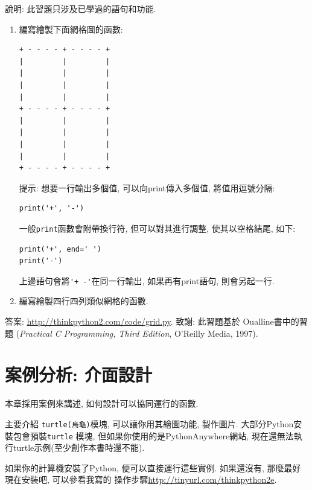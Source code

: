\documentclass[10pt]{book}
\begin{document}
\begin{exercise}

說明: 此習題只涉及已學過的語句和功能. 

\begin{enumerate}

\item 編寫繪製下面網格圖的函數:

\begin{verbatim}
+ - - - - + - - - - +
|         |         |
|         |         |
|         |         |
|         |         |
+ - - - - + - - - - +
|         |         |
|         |         |
|         |         |
|         |         |
+ - - - - + - - - - +
\end{verbatim}
%
提示: 想要一行輸出多個值, 可以向print傳入多個值, 將值用逗號分隔:

\begin{verbatim}
print('+', '-')
\end{verbatim}
%
一般{\tt print}函數會附帶換行符, 但可以對其進行調整, 
使其以空格結尾, 如下:

\begin{verbatim}
print('+', end=' ')
print('-')
\end{verbatim}
%
上邊語句會將\verb"'+ -'"在同一行輸出, 如果再有print語句, 則會另起一行. 

\item 編寫繪製四行四列類似網格的函數. 

\end{enumerate}

答案: \url{http://thinkpython2.com/code/grid.py}.
致謝: 此習題基於 Oualline書中的習題
({\em Practical C Programming, Third Edition},  
O'Reilly Media, 1997).

\end{exercise}


\chapter{案例分析: 介面設計}
\label{turtlechap}

本章採用案例來講述, 如何設計可以協同運行的函數. 

主要介紹 {\tt turtle(烏龜)}模塊, 可以讓你用其繪圖功能, 製作圖片. 
大部分Python安裝包會預裝{\tt turtle} 模塊, 但如果你使用的是PythonAnywhere網站, 
現在還無法執行turtle示例(至少創作本書時還不能). 

如果你的計算機安裝了Python,  便可以直接運行這些實例. 
如果還沒有, 那麼最好現在安裝吧, 可以參看我寫的
操作步驟\url{http://tinyurl.com/thinkpython2e}. 
\end{document}
